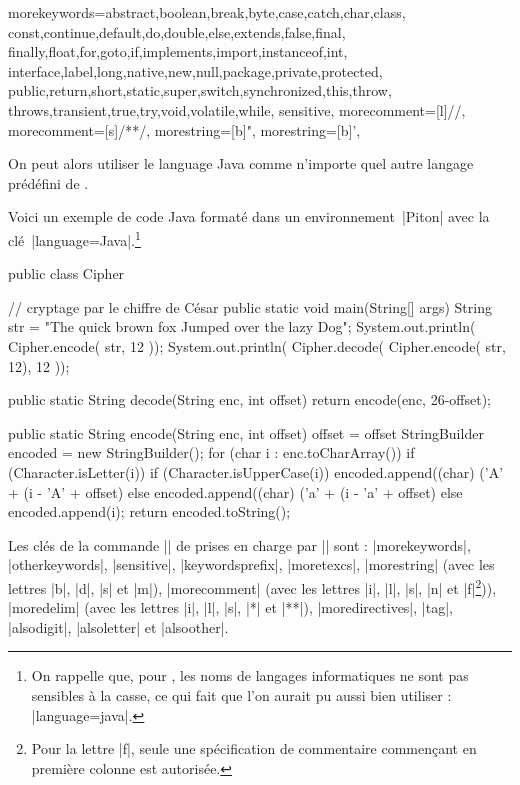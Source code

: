 \documentclass[dvipsnames,svgnames]{article}
\begin{document}
  {morekeywords={abstract,boolean,break,byte,case,catch,char,class,
      const,continue,default,do,double,else,extends,false,final,
      finally,float,for,goto,if,implements,import,instanceof,int,
      interface,label,long,native,new,null,package,private,protected,
      public,return,short,static,super,switch,synchronized,this,throw,
      throws,transient,true,try,void,volatile,while},
   sensitive,
   morecomment=[l]//,
   morecomment=[s]{/*}{*/},
   morestring=[b]",
   morestring=[b]',
  }


\medskip
On peut alors utiliser le language Java comme n'importe quel autre langage prédéfini de
.

Voici un exemple de code Java formaté dans un environnement~|{Piton}| avec la
clé~|language=Java|.\footnote{On rappelle que, pour , les noms de langages
  informatiques ne sont pas sensibles à la casse, ce qui fait que l'on aurait pu aussi
  bien utiliser : |language=java|.}

\bigskip
\begingroup
\small
{}
\begin{Piton}[language = Java]
public class Cipher { // cryptage par le chiffre de César
    public static void main(String[] args) {
        String str = "The quick brown fox Jumped over the lazy Dog";
        System.out.println( Cipher.encode( str, 12 ));
        System.out.println( Cipher.decode( Cipher.encode( str, 12), 12 ));
    }

    public static String decode(String enc, int offset) {
        return encode(enc, 26-offset);
    }

    public static String encode(String enc, int offset) {
        offset = offset %
        StringBuilder encoded = new StringBuilder();
        for (char i : enc.toCharArray()) {
            if (Character.isLetter(i)) {
                if (Character.isUpperCase(i)) {
                    encoded.append((char) ('A' + (i - 'A' + offset) %
                } else {
                    encoded.append((char) ('a' + (i - 'a' + offset) %
                }
            } else {
                encoded.append(i);
            }
        }
        return encoded.toString();
    }
}
\end{Piton}
\endgroup

\bigskip
Les clés de la commande |\lstdefinelanguage| de  prises en charge par
|\NewPitonLanguage| sont : |morekeywords|, |otherkeywords|, |sensitive|,
|keywordsprefix|, |moretexcs|, |morestring| (avec les lettres |b|, |d|, |s| et
|m|), |morecomment| (avec les lettres |i|, |l|, |s|, |n| et |f|\footnote{Pour la lettre |f|, seule une spécification de commentaire commençant en première colonne est autorisée.})),
|moredelim| (avec les lettres |i|, |l|, |s|, |*| et |**|), |moredirectives|,
|tag|, |alsodigit|, |alsoletter| et |alsoother|.
\end{document}

